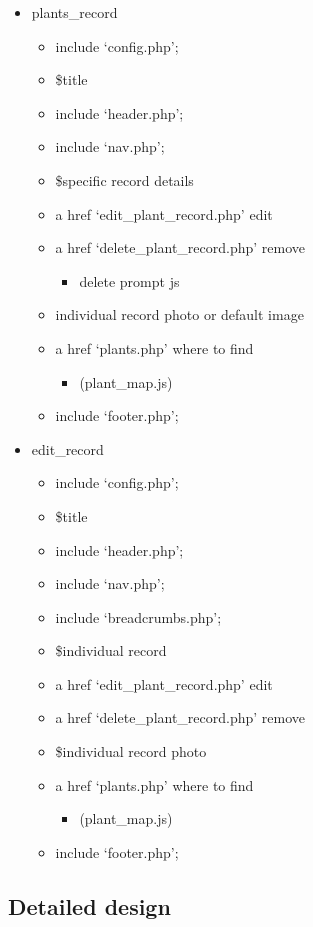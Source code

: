 \begin{itemize}
	\item plants\_record
	\begin{itemize}
		\item include `config.php';
		\item \$title
		\item include `header.php';
		\item include `nav.php';
		\item \$specific record details
		\item a href `edit\_plant\_record.php' edit
		\item a href `delete\_plant\_record.php' remove
		\begin{itemize}
			\item delete prompt js
		\end{itemize}
		\item individual record photo or default image
		\item a href `plants.php' where to find
		\begin{itemize}
			\item (plant\_map.js)
		\end{itemize}
		\item include `footer.php';
	\end{itemize}

	\item edit\_record
	\begin{itemize}
		\item include `config.php';
		\item \$title
		\item include `header.php';
		\item include `nav.php';
		\item include `breadcrumbs.php';
		\item \$individual record
		\item a href `edit\_plant\_record.php' edit
		\item a href `delete\_plant\_record.php' remove
		\item \$individual record photo
		\item a href `plants.php' where to find
		\begin{itemize}
			\item (plant\_map.js)
		\end{itemize}
		\item include `footer.php';
	\end{itemize}
\end{itemize}
		
\subsection{Detailed design}

